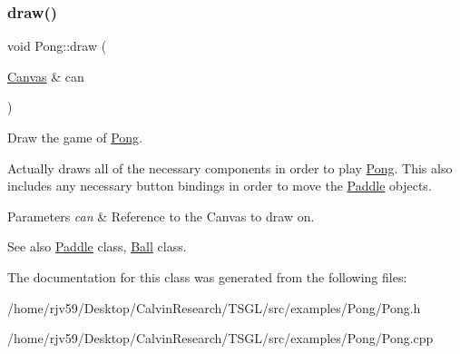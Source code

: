 \subsubsection{\texorpdfstring{draw()}{draw()}}
{\footnotesize\ttfamily void Pong\+::draw (\begin{DoxyParamCaption}\item[{\hyperlink{classtsgl_1_1_canvas}{Canvas} \&}]{can }\end{DoxyParamCaption})}



Draw the game of \hyperlink{class_pong}{Pong}. 

Actually draws all of the necessary components in order to play \hyperlink{class_pong}{Pong}. This also includes any necessary button bindings in order to move the \hyperlink{class_paddle}{Paddle} objects. 
\begin{DoxyParams}{Parameters}
{\em can} & Reference to the Canvas to draw on. \\
\hline
\end{DoxyParams}
\begin{DoxySeeAlso}{See also}
\hyperlink{class_paddle}{Paddle} class, \hyperlink{class_ball}{Ball} class. 
\end{DoxySeeAlso}


The documentation for this class was generated from the following files\+:\begin{DoxyCompactItemize}
\item 
/home/rjv59/\+Desktop/\+Calvin\+Research/\+T\+S\+G\+L/src/examples/\+Pong/Pong.\+h\item 
/home/rjv59/\+Desktop/\+Calvin\+Research/\+T\+S\+G\+L/src/examples/\+Pong/Pong.\+cpp\end{DoxyCompactItemize}
